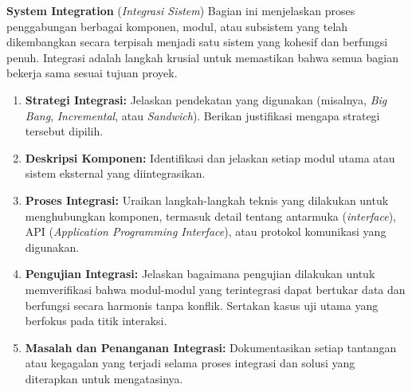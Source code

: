 \documentclass{elsinta}
\begin{document}
\textbf{System Integration} (\textit{Integrasi Sistem})
Bagian ini menjelaskan proses penggabungan berbagai komponen, modul, atau subsistem yang telah dikembangkan secara terpisah menjadi satu sistem yang kohesif dan berfungsi penuh. Integrasi adalah langkah krusial untuk memastikan bahwa semua bagian bekerja sama sesuai tujuan proyek.
\begin{enumerate}
    \item \textbf{Strategi Integrasi:} Jelaskan pendekatan yang digunakan (misalnya, \textit{Big Bang}, \textit{Incremental}, atau \textit{Sandwich}). Berikan justifikasi mengapa strategi tersebut dipilih.
    \item \textbf{Deskripsi Komponen:} Identifikasi dan jelaskan setiap modul utama atau sistem eksternal yang diintegrasikan.
    \item \textbf{Proses Integrasi:} Uraikan langkah-langkah teknis yang dilakukan untuk menghubungkan komponen, termasuk detail tentang antarmuka (\textit{interface}), API (\textit{Application Programming Interface}), atau protokol komunikasi yang digunakan.
    \item \textbf{Pengujian Integrasi:} Jelaskan bagaimana pengujian dilakukan untuk memverifikasi bahwa modul-modul yang terintegrasi dapat bertukar data dan berfungsi secara harmonis tanpa konflik. Sertakan kasus uji utama yang berfokus pada titik interaksi.
    \item \textbf{Masalah dan Penanganan Integrasi:} Dokumentasikan setiap tantangan atau kegagalan yang terjadi selama proses integrasi dan solusi yang diterapkan untuk mengatasinya.
\end{enumerate}

\vspace{0.5cm}
\end{document}
